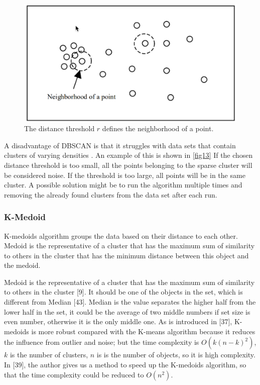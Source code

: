 \documentclass[a4paper, 12pt]{article}
\begin{document}
\begin{figure}[ht]
    \centering
    \includegraphics[width=1\textwidth]{DBSCAN disadvantage.png}
    \caption{The distance threshold $r$ defines the neighborhood of a point. \citep{ertoz2003finding}}
    \label{fig13}
\end{figure}

A disadvantage of DBSCAN is that it struggles with data sets that contain clusters of varying densities \citep{ertoz2003finding}. An example of this is shown in \autoref{fig13} If the chosen distance threshold is too small, all the points belonging to the sparse cluster will be considered noise. If the threshold is too large, all points will be in the same cluster. A possible solution might be to run the algorithm multiple times and removing the already found clusters from the data set after each run.

\subsubsection{K-Medoid}
K-medoids algorithm groups the data based on their distance to each other. Medoid is the representative of a cluster that has the maximum sum of similarity to others in the cluster that has the minimum distance between this object and the medoid.

Medoid is the representative of a cluster that has the maximum sum of similarity to others in the cluster [9]. It should be one of the objects in the set, which is different from Median [43]. Median is the value separates the higher half from the lower half in the set, it could be the average of two middle numbers if set size is even number, otherwise it is the only middle one. As is introduced in [37], K-medoids is more robust compared with the K-means algorithm because it reduces the influence from outlier and noise; but the time complexity is $O(k(n-k)^2)$, $k$ is the number of clusters, $n$ is is the number
of objects, so it is high complexity. In [39], the author gives us a method to speed up the K-medoids algorithm, so that the time complexity could be reduced to $O(n^2)$.
\end{document}
